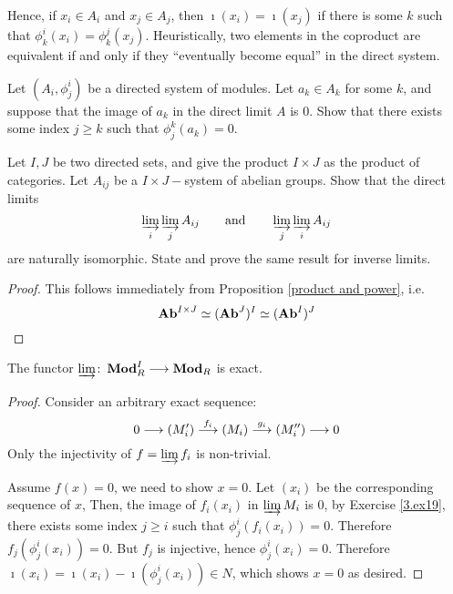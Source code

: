   Hence, if $x_i\in A_i$ and $x_j\in A_j$, then $\imath(x_i) = \imath(x_j)$ if there is some $k$ such that $\phi^i_k(x_i)=\phi^j_k(x_j)$.
  Heuristically, two elements in the coproduct are equivalent if and only if they ``eventually become equal'' in the direct system.
  \begin{ex}\label{3.ex19}
    Let $(A_i, \phi^i_j)$ be a directed system of modules. Let $a_k\in A_k$ for some $k$, and suppose that the image of $a_k$ in the direct limit $A$ is $0$. Show that there exists some index $j\geqslant k$ such that $\phi^k_j(a_k) = 0$.
  \end{ex}

  \begin{ex}
    Let $I,J$ be two directed sets, and give the product $I\times J$ as the product of categories. Let $A_{ij}$ be a $I\times J-$system of abelian groups.
    Show that the direct limits
    \begin{equation*}
      \operatorname*{\underrightarrow{\lim}}_i\operatorname*{\underrightarrow{\lim}}_j A_{ij} \qquad \text{and} \qquad \operatorname*{\underrightarrow{\lim}}_j\operatorname*{\underrightarrow{\lim}}_i A_{ij}
    \end{equation*}
    are naturally isomorphic. State and prove the same result for inverse limits.
  \end{ex}
  \begin{proof}
    This follows immediately from Proposition \ref{product and power}, i.e.
    \begin{equation*}
      \operatorname{\mathbf{Ab}}^{I\times J}\simeq(\operatorname{\mathbf{Ab}}^J)^I\simeq(\operatorname{\mathbf{Ab}}^I)^J
    \end{equation*}
  \end{proof}

  \begin{ex}
    The functor $\operatorname*{\underrightarrow{\lim}}\colon\operatorname{\mathbf{Mod}}_R^I\longrightarrow\operatorname{\mathbf{Mod}}_R$ is exact.
  \end{ex}
  \begin{proof}
    Consider an arbitrary exact sequence:
    \begin{equation*}
      0 \longrightarrow (M'_i) \stackrel{{f_i}}{\longrightarrow} (M_i) \stackrel{{g_i}}{\longrightarrow} (M''_i) \longrightarrow 0
    \end{equation*}
    Only the injectivity of $f=\operatorname*{\underrightarrow{\lim}} f_i$ is non-trivial.

    Assume $f(x)=0$, we need to show $x=0$. Let $(x_i)$ be the corresponding sequence of $x$,
    Then, the image of $f_i(x_i)$ in $\operatorname*{\underrightarrow{\lim}} M_i$ is $0$, by Exercise \ref{3.ex19}, there exists some index $j\geqslant i$ such that $\phi^i_j(f_i(x_i)) = 0$.
    Therefore $f_j(\phi^i_j(x_i)) = 0$. But $f_j$ is injective, hence $\phi^i_j(x_i)=0$. Therefore $\imath(x_i)=\imath(x_i)-\imath(\phi^i_j(x_i))\in N$, which shows $x=0$ as desired.
  \end{proof}


